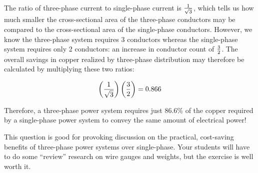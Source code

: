 \vskip 10pt

The ratio of three-phase current to single-phase current is $1 \over \sqrt{3}$, which tells us how much smaller the cross-sectional area of the three-phase conductors may be compared to the cross-sectional area of the single-phase conductors.  However, we know the three-phase system requires 3 conductors whereas the single-phase system requires only 2 conductors: an increase in conductor count of $3 \over 2$.  The overall savings in copper realized by three-phase distribution may therefore be calculated by multiplying these two ratios:

$$\left(1 \over \sqrt{3}\right) \left(3 \over 2\right) = 0.866$$

Therefore, a three-phase power system requires just 86.6\% of the copper required by a single-phase power system to convey the same amount of electrical power!







This question is good for provoking discussion on the practical, cost-saving benefits of three-phase power systems over single-phase.  Your students will have to do some ``review'' research on wire gauges and weights, but the exercise is well worth it.




